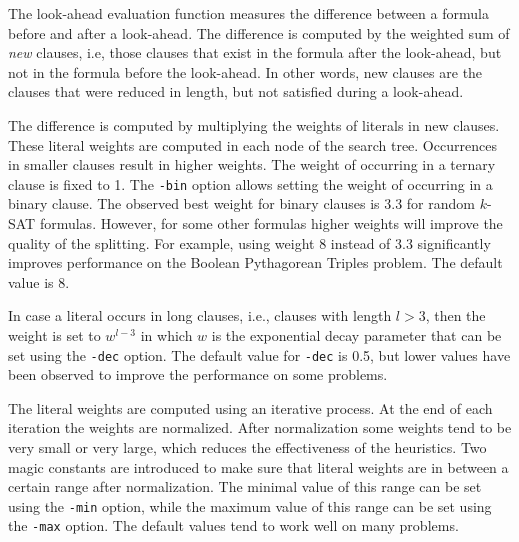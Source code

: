 \documentclass{llncs}
\begin{document}
The look-ahead evaluation function measures the difference between a formula before and after a look-ahead. 
The difference is computed by the weighted sum of {\em new} clauses, i.e, those clauses that exist in the formula after the look-ahead, but
not in the formula before the look-ahead. In other words, new clauses are the clauses that were reduced in length, but not satisfied
during a look-ahead.

The difference is computed by multiplying the weights of literals in new clauses. These literal weights are computed in each node
of the search tree. Occurrences in smaller clauses result in higher weights. The weight of occurring in a ternary clause is fixed to 1.
The {\tt -bin} option allows setting the weight of occurring in a binary clause. The observed best weight for binary clauses is 3.3 for random $k$-SAT formulas.
However, for some other formulas higher weights will improve the quality of the splitting. For example, using weight 8 instead of 3.3
significantly improves performance on the Boolean Pythagorean Triples problem. The default value is 8.

In case a literal occurs in long clauses, i.e., clauses with length $l > 3$, then the weight is set to $w^{l-3}$ in which $w$ is the exponential decay parameter 
that can be set using the {\tt -dec} option. The default value for {\tt -dec} is 0.5, but lower values have been observed to improve the 
performance on some problems.

The literal weights are computed using an iterative process. At the end of each iteration the weights are normalized. After normalization
some weights tend to be very small or very large, which reduces the effectiveness of the heuristics. Two magic constants are introduced
to make sure that literal weights are in between a certain range after normalization. The minimal value of this range can be set using
the {\tt -min} option, while the maximum value of this range can be set using the {\tt -max} option. The default values tend to work
well on many problems. 
\end{document}
